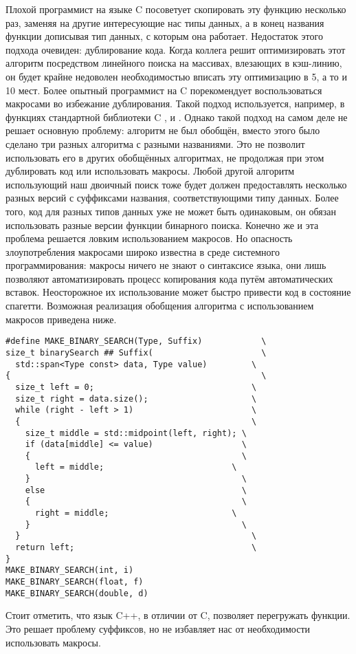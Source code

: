 Плохой программист на языке C посоветует скопировать эту функцию несколько раз, заменяя  на другие интересующие нас типы данных, а в конец названия функции дописывая тип данных, с которым она работает.
Недостаток этого подхода очевиден: дублирование кода.
Когда коллега решит оптимизировать этот алгоритм посредством линейного поиска на массивах, влезающих в кэш-линию, он будет крайне недоволен необходимостью вписать эту оптимизацию в 5, а то и 10 мест.
Более опытный программист на C порекомендует воспользоваться макросами во избежание дублирования.
Такой подход используется, например, в функциях стандартной библиотеки C ,  и .
Однако такой подход на самом деле не решает основную проблему: алгоритм не был обобщён, вместо этого было сделано три разных алгоритма с разными названиями.
Это не позволит использовать его в других обобщённых алгоритмах, не продолжая при этом дублировать код или использовать макросы.
Любой другой алгоритм использующий наш двоичный поиск тоже будет должен предоставлять несколько разных версий с суффиксами названия, соответствующими типу данных.
Более того, код для разных типов данных уже не может быть одинаковым, он обязан использовать разные версии функции бинарного поиска.
Конечно же и эта проблема решается ловким использованием макросов.
Но опасность злоупотребления макросами широко известна в среде системного программирования: макросы ничего не знают о синтаксисе языка, они лишь позволяют автоматизировать процесс копирования кода путём автоматических вставок.
Неосторожное их использование может быстро привести код в состояние спагетти.
Возможная реализация обобщения алгоритма  с использованием макросов приведена ниже.
\begin{verbatim}
#define MAKE_BINARY_SEARCH(Type, Suffix)            \
size_t binarySearch ## Suffix(                      \
  std::span<Type const> data, Type value)         \
{                                                   \
  size_t left = 0;                                \
  size_t right = data.size();                     \
  while (right - left > 1)                        \
  {                                               \
    size_t middle = std::midpoint(left, right); \
    if (data[middle] <= value)                  \
    {                                           \
      left = middle;                          \
    }                                           \
    else                                        \
    {                                           \
      right = middle;                         \
    }                                           \
  }                                               \
  return left;                                    \
}
MAKE_BINARY_SEARCH(int, i)
MAKE_BINARY_SEARCH(float, f)
MAKE_BINARY_SEARCH(double, d)
\end{verbatim}
Стоит отметить, что язык C++, в отличии от C, позволяет перегружать функции.
Это решает проблему суффиксов, но не избавляет нас от необходимости использовать макросы.

